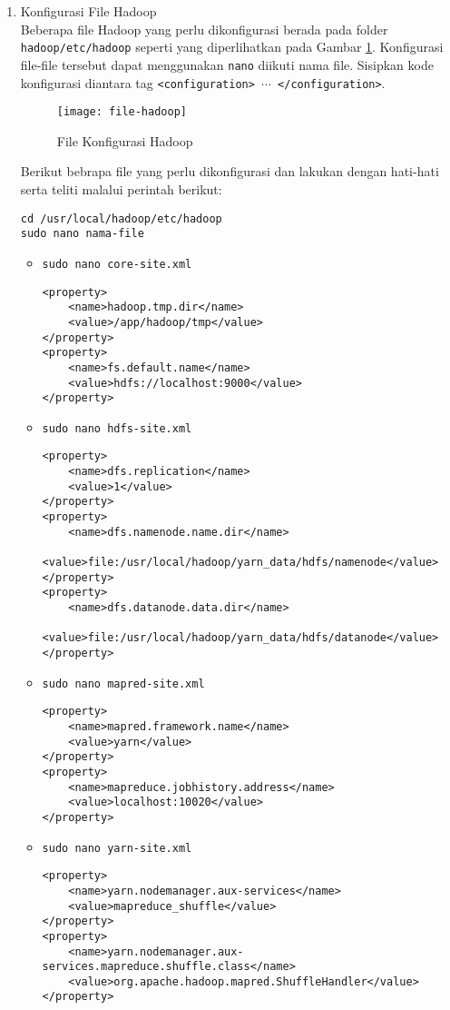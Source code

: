 \documentclass[a4paper]{tufte-handout}
\begin{document}
\begin{enumerate}
\item Konfigurasi File Hadoop \\
Beberapa file Hadoop yang perlu dikonfigurasi berada pada folder {\tt hadoop/etc/hadoop} seperti yang diperlihatkan pada Gambar \ref{gam:file-hadoop}. Konfigurasi file-file tersebut dapat menggunakan {\tt nano} diikuti nama file. Sisipkan kode konfigurasi diantara tag {\tt <configuration> $\cdots$ </configuration>}.

\begin{figure}[!ht]
\texttt{[image: file-hadoop]}
\caption{File Konfigurasi Hadoop}
\label{gam:file-hadoop}
\end{figure}

Berikut bebrapa file yang perlu dikonfigurasi dan lakukan dengan hati-hati serta teliti malalui perintah berikut:

{\tt cd /usr/local/hadoop/etc/hadoop} \\
{\tt sudo nano nama-file}

\begin{itemize}

\item {\tt sudo nano core-site.xml}
\begin{lstlisting}
<property>
	<name>hadoop.tmp.dir</name>
	<value>/app/hadoop/tmp</value>
</property>
<property>
	<name>fs.default.name</name>
	<value>hdfs://localhost:9000</value>
</property>
\end{lstlisting}

\item {\tt sudo nano hdfs-site.xml}
\begin{lstlisting}
<property>
	<name>dfs.replication</name>
	<value>1</value>
</property>
<property>
	<name>dfs.namenode.name.dir</name>
	<value>file:/usr/local/hadoop/yarn_data/hdfs/namenode</value>
</property>
<property>
	<name>dfs.datanode.data.dir</name>
	<value>file:/usr/local/hadoop/yarn_data/hdfs/datanode</value>
</property>
\end{lstlisting}

\item {\tt sudo nano mapred-site.xml}
\begin{lstlisting}
<property>
	<name>mapred.framework.name</name>
	<value>yarn</value>
</property>
<property>
	<name>mapreduce.jobhistory.address</name>
	<value>localhost:10020</value>
</property>
\end{lstlisting}

\item {\tt sudo nano yarn-site.xml}
\begin{lstlisting}
<property>
	<name>yarn.nodemanager.aux-services</name>
	<value>mapreduce_shuffle</value>
</property>
<property>
	<name>yarn.nodemanager.aux-services.mapreduce.shuffle.class</name>
	<value>org.apache.hadoop.mapred.ShuffleHandler</value>
</property>
\end{lstlisting}
\end{itemize}


\end{enumerate}
\end{document}
